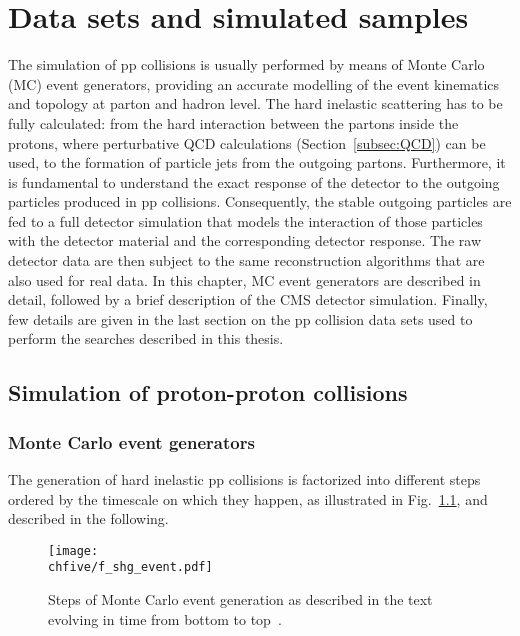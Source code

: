 \chapter{Data sets and simulated samples}
\label{ch:dataAndSim}

The simulation of pp collisions is usually performed by means of Monte Carlo (MC) event generators, providing an accurate modelling of the event kinematics and topology at parton and hadron level.
The hard inelastic scattering has to be fully calculated: from the hard interaction between the partons inside the protons, where perturbative QCD calculations (Section~\ref{subsec:QCD}) can be used, to the formation of particle jets from the outgoing partons.
Furthermore, it is fundamental to understand the exact response of the detector to the outgoing particles produced in pp collisions. 
Consequently, the stable outgoing particles are fed to a full detector simulation that models the interaction of those particles with the detector material and the corresponding detector response.
The raw detector data are then subject to the same reconstruction algorithms that are also used for real data.
In this chapter, MC event generators are described in detail, followed by a brief description of the CMS detector simulation.
Finally, few details are given in the last section on the pp collision data sets used to perform the searches described in this thesis.

\section{Simulation of proton-proton collisions}

\subsection{Monte Carlo event generators}

The generation of hard inelastic pp collisions is factorized into different steps ordered by the timescale on which they happen, as illustrated in Fig.~\ref{fig:MCgenSteps}, and described in the following.\\

\begin{figure}[!htb]
\centering
\texttt{[image: \\chfive/f\_shg\_event.pdf]}
\caption{Steps of Monte Carlo event generation as described in the text evolving in time from bottom to top~\cite{Dobbs:2004qw}.}
\label{fig:MCgenSteps}
\end{figure}

